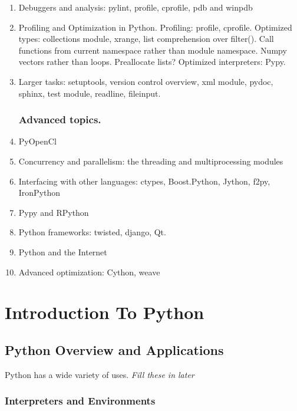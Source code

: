 \documentclass{report}
\begin{document}
\begin{enumerate}
    \item Debuggers and analysis: pylint, profile, cprofile, pdb and winpdb

    \item Profiling and Optimization in Python. Profiling: profile, cprofile. Optimized types: collections module, xrange, list comprehension over filter(). Call functions from current namespace rather than module namespace. Numpy vectors rather than loops. Preallocate lists? Optimized interpreters: Pypy.

    \item Larger tasks: setuptools, version control overview, xml module, pydoc, sphinx, test module, readline, fileinput.

\subsection{Advanced topics.}
    \item PyOpenCl

    \item Concurrency and parallelism: the threading and multiprocessing modules

    \item Interfacing with other languages: ctypes, Boost.Python, Jython, f2py, IronPython

    \item Pypy and RPython

    \item Python frameworks: twisted, django, Qt.

    \item Python and the Internet

    \item Advanced optimization: Cython, weave

\end{enumerate}


\chapter{Introduction To Python}
\section{Python Overview and Applications}
Python has a wide variety of uses. \emph{Fill these in later}
\subsection{Interpreters and Environments}
\end{document}
